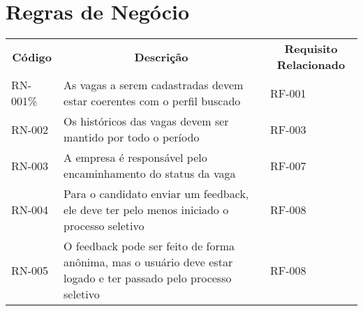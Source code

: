 \section{Regras de Negócio}
\begin{table}[]
	\begin{tabular}{lll}
		\multicolumn{1}{c}{\textbf{Código}} & \multicolumn{1}{c}{\textbf{Descrição}} & \multicolumn{1}{c}{\textbf{Requisito Relacionado}} \\
		RN-001\%                            & As vagas a serem cadastradas devem estar coerentes com o perfil buscado &  RF-001                                                  \\
		RN-002                              & Os históricos das vagas devem ser mantido por todo o período            &  RF-003                                                  \\
		RN-003                              & A empresa é responsável pelo encaminhamento do status da vaga           &  RF-007                                                  \\
		RN-004                              & Para o candidato enviar um feedback, ele deve ter pelo menos iniciado o processo seletivo & RF-008                                 \\
		RN-005                              & O feedback pode ser feito de forma anônima, mas o usuário deve estar logado e ter passado pelo processo seletivo & RF-008            
	\end{tabular}
\end{table}

